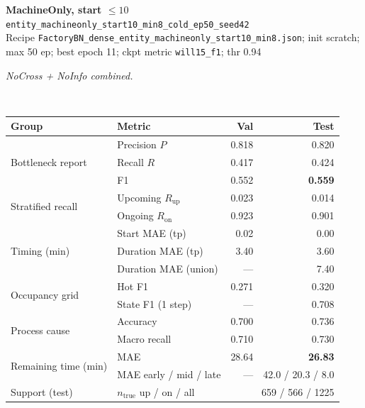 \documentclass[9pt,a4paper,twocolumn]{extarticle}
\begin{document}
\noindent\begin{minipage}{\columnwidth}
\begin{center}
{\small\bfseries MachineOnly, start $\le 10$}\\
{\scriptsize\texttt{entity\_machineonly\_start10\_min8\_cold\_ep50\_seed42}}\\
{\scriptsize Recipe \texttt{FactoryBN\_dense\_entity\_machineonly\_start10\_min8.json}; init scratch; max 50 ep; best epoch 11; ckpt metric \texttt{will15\_f1}; thr 0.94}\\[1pt]
\parbox{0.96\columnwidth}{\scriptsize\itshape NoCross + NoInfo combined.}\\[2pt]
\scriptsize\setlength{\tabcolsep}{3pt}
\begin{tabular}{llrr}
\toprule
Group & Metric & Val & Test \\
\midrule
\multirow{3}{*}{Bottleneck report}
  & Precision $P$ & 0.818 & 0.820 \\
  & Recall $R$ & 0.417 & 0.424 \\
  & F1 & 0.552 & \textbf{0.559} \\
\midrule
\multirow{2}{*}{Stratified recall}
  & Upcoming $R_{\mathrm{up}}$ & 0.023 & 0.014 \\
  & Ongoing $R_{\mathrm{on}}$ & 0.923 & 0.901 \\
\midrule
\multirow{3}{*}{Timing (min)}
  & Start MAE (tp) & 0.02 & 0.00 \\
  & Duration MAE (tp) & 3.40 & 3.60 \\
  & Duration MAE (union) & --- & 7.40 \\
\midrule
\multirow{2}{*}{Occupancy grid}
  & Hot F1 & 0.271 & 0.320 \\
  & State F1 (1 step) & --- & 0.708 \\
\midrule
\multirow{2}{*}{Process cause}
  & Accuracy & 0.700 & 0.736 \\
  & Macro recall & 0.710 & 0.730 \\
\midrule
\multirow{2}{*}{Remaining time (min)}
  & MAE & 28.64 & \textbf{26.83} \\
  & MAE early / mid / late & --- & 42.0 / 20.3 / 8.0 \\
\midrule
Support (test)
  & $n_{\mathrm{true}}$ up / on / all & \multicolumn{2}{r}{659 / 566 / 1225} \\
\bottomrule
\end{tabular}
\end{center}
\end{minipage}\par\vspace{6pt}
\end{document}
